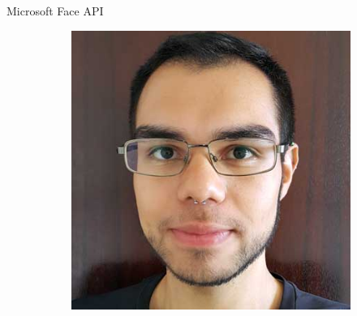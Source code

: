 \begin{frame}{Microsoft Face API}
\begin{figure}[htbp]
    \label{fig:face_api_test2}
    \begin{subfigure}[c]{0.48\textwidth}
    \centering
    \includegraphics[height=\textheight,width=\textwidth,keepaspectratio]{imagens/profile.jpg}
    \end{subfigure}
    \begin{subfigure}[c]{0.48\textwidth}

\end{subfigure}
\end{figure}
\end{frame}
